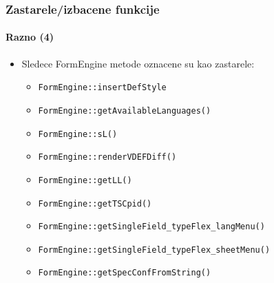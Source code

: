\begin{frame}[fragile]
	\frametitle{Zastarele/izbacene funkcije}
	\framesubtitle{Razno (4)}

	\begin{itemize}
		\item Sledece FormEngine metode oznacene su kao zastarele:
		\begin{itemize}
			\item \texttt{FormEngine::insertDefStyle}
			\item \texttt{FormEngine::getAvailableLanguages()}
			\item \texttt{FormEngine::sL()}
			\item \texttt{FormEngine::renderVDEFDiff()}
			\item \texttt{FormEngine::getLL()}
 			\item \texttt{FormEngine::getTSCpid()}
 			\item \texttt{FormEngine::getSingleField\_typeFlex\_langMenu()}
 			\item \texttt{FormEngine::getSingleField\_typeFlex\_sheetMenu()}
 			\item \texttt{FormEngine::getSpecConfFromString()}
 		\end{itemize}
	\end{itemize}

\end{frame}

